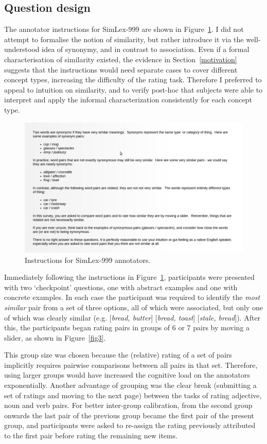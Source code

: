 \subsection{Question design}

The annotator instructions for SimLex-999 are shown in Figure~\ref{fig2}. I did not attempt to formalise the notion of similarity, but rather introduce it via the well-understood idea of synonymy, and in contrast to association. Even if a formal characterisation of similarity existed, the evidence in Section~\ref{motivation} suggests that the instructions would need separate cases to cover different concept types, increasing the difficulty of the rating task. Therefore I preferred to appeal to intuition on similarity, and to verify post-hoc that subjects were able to interpret and apply the informal characterization consistently for each concept type. 

\begin{figure}[ht]  \includegraphics[width = \textwidth]{Chapter_2/screenshot1_CL}  \caption{\label{fig2} Instructions for SimLex-999 annotators.}\end{figure} 

Immediately following the instructions in Figure~\ref{fig2}, participants were presented with two `checkpoint' questions, one with abstract examples and one with concrete examples. In each case the participant was required to identify the \emph{most similar} pair from a set of three options, all of which were associated, but only one of which was clearly similar (e.g. [\emph{bread, butter}] [\emph{bread, toast}] [\emph{stale, bread}]). After this, the participants began rating pairs in groups of 6 or 7 pairs by moving a slider, as shown in Figure~\ref{fig3}.

This group size was chosen because the (relative) rating of a set of pairs implicitly requires pairwise comparisons between all pairs in that set. Therefore, using larger groups would have increased the cognitive load on the annotators exponentially. Another advantage of grouping was the clear break (submitting a set of ratings and moving to the next page) between the tasks of rating adjective, noun and verb pairs. For better inter-group calibration, from the second group onwards the last pair of the previous group became the first pair of the present group, and participants were asked to re-assign the rating previously attributed to the first pair before rating the remaining new items.  

